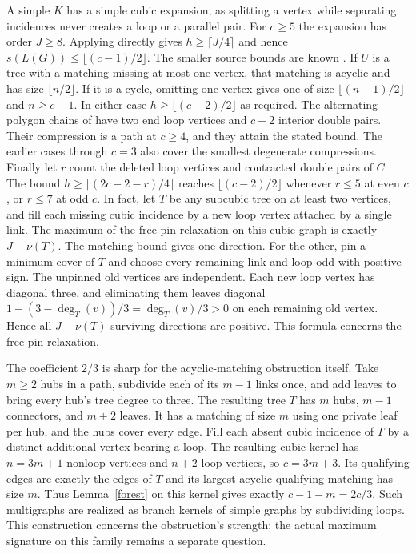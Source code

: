 \documentclass[11pt]{article}
\begin{document}
A simple $K$ has a simple cubic expansion, as splitting a vertex while separating incidences never creates a loop or a parallel pair. For $c\ge5$ the expansion has order $J\ge8$. Applying \cite{FR} directly gives $h\ge\lceil J/4\rceil$ and hence $s(L(G))\le\lfloor(c-1)/2\rfloor$. The smaller source bounds are known \cite{prev}. If $U$ is a tree with a matching missing at most one vertex, that matching is acyclic and has size $\lfloor n/2\rfloor$. If it is a cycle, omitting one vertex gives one of size $\lfloor(n-1)/2\rfloor$ and $n\ge c-1$. In either case $h\ge\lfloor(c-2)/2\rfloor$ as required. The alternating polygon chains of \cite{PP} have two end loop vertices and $c-2$ interior double pairs. Their compression is a path at $c\ge4$, and they attain the stated bound. The earlier cases through $c=3$ also cover the smallest degenerate compressions. Finally let $r$ count the deleted loop vertices and contracted double pairs of $C$. The bound $h\ge\lceil(2c-2-r)/4\rceil$ reaches $\lfloor(c-2)/2\rfloor$ whenever $r\le5$ at even $c$, or $r\le7$ at odd $c$.
In fact, let $T$ be any subcubic tree on at least two vertices, and fill each missing cubic incidence by a new loop vertex attached by a single link. The maximum of the free-pin relaxation on this cubic graph is exactly $J-\nu(T)$. The matching bound gives one direction. For the other, pin a minimum cover of $T$ and choose every remaining link and loop odd with positive sign. The unpinned old vertices are independent. Each new loop vertex has diagonal three, and eliminating them leaves diagonal $1-(3-\deg_T(v))/3=\deg_T(v)/3>0$ on each remaining old vertex. Hence all $J-\nu(T)$ surviving directions are positive. This formula concerns the free-pin relaxation.

The coefficient $2/3$ is sharp for the acyclic-matching obstruction itself. Take $m\ge2$ hubs in a path, subdivide each of its $m-1$ links once, and add leaves to bring every hub's tree degree to three. The resulting tree $T$ has $m$ hubs, $m-1$ connectors, and $m+2$ leaves. It has a matching of size $m$ using one private leaf per hub, and the hubs cover every edge. Fill each absent cubic incidence of $T$ by a distinct additional vertex bearing a loop. The resulting cubic kernel has $n=3m+1$ nonloop vertices and $n+2$ loop vertices, so $c=3m+3$. Its qualifying edges are exactly the edges of $T$ and its largest acyclic qualifying matching has size $m$. Thus Lemma~\ref{forest} on this kernel gives exactly $c-1-m=2c/3$. Such multigraphs are realized as branch kernels of simple graphs by subdividing loops. This construction concerns the obstruction's strength; the actual maximum signature on this family remains a separate question.
\end{document}
